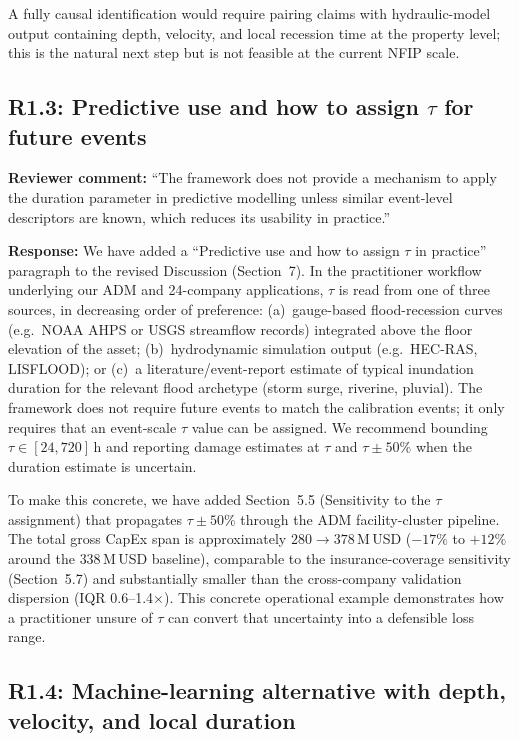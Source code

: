 \documentclass[11pt]{article}
\begin{document}
A fully causal identification would require pairing claims with hydraulic-model output containing depth, velocity, and local recession time at the property level; this is the natural next step but is not feasible at the current NFIP scale.

\subsection*{R1.3: Predictive use and how to assign $\tau$ for future events}

\textbf{Reviewer comment:} ``The framework does not provide a mechanism to apply the duration parameter in predictive modelling unless similar event-level descriptors are known, which reduces its usability in practice.''

\textbf{Response:} We have added a ``Predictive use and how to assign $\tau$ in practice'' paragraph to the revised Discussion (Section~7). In the practitioner workflow underlying our ADM and 24-company applications, $\tau$ is read from one of three sources, in decreasing order of preference: (a)~gauge-based flood-recession curves (e.g.\ NOAA AHPS or USGS streamflow records) integrated above the floor elevation of the asset; (b)~hydrodynamic simulation output (e.g.\ HEC-RAS, LISFLOOD); or (c)~a literature/event-report estimate of typical inundation duration for the relevant flood archetype (storm surge, riverine, pluvial). The framework does not require future events to match the calibration events; it only requires that an event-scale $\tau$ value can be assigned. We recommend bounding $\tau \in [24,720]$\,h and reporting damage estimates at $\tau$ and $\tau \pm 50\%$ when the duration estimate is uncertain.

To make this concrete, we have added Section~5.5 (Sensitivity to the $\tau$ assignment) that propagates $\tau \pm 50\%$ through the ADM facility-cluster pipeline. The total gross CapEx span is approximately $280 \to 378$\,M\,USD ($-17\%$ to $+12\%$ around the $338$\,M\,USD baseline), comparable to the insurance-coverage sensitivity (Section~5.7) and substantially smaller than the cross-company validation dispersion (IQR 0.6--1.4$\times$). This concrete operational example demonstrates how a practitioner unsure of $\tau$ can convert that uncertainty into a defensible loss range.

\subsection*{R1.4: Machine-learning alternative with depth, velocity, and local duration}
\end{document}
